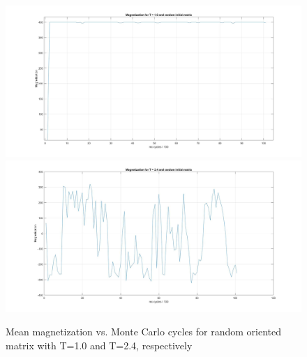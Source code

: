 \documentclass[10pt,a4paper]{article}
\begin{document}
\begin{figure}[H]
\centerline{
\includegraphics[scale=0.15]{magnetizationT1random}
\includegraphics[scale=0.15]{magnetizationT24random}
}
\caption{Mean magnetization vs. Monte Carlo cycles for random oriented matrix with T=1.0 and T=2.4, respectively}
\label{fig:meanmagnran}
\end{figure}
\end{document}
